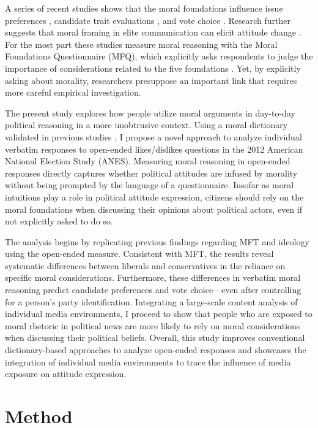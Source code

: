 \documentclass[12pt]{article}
\begin{document}
A series of recent studies shows that the moral foundations influence issue preferences \citep{kertzer2014moral}, candidate trait evaluations \citep{clifford2014linking}, and vote choice \citep{iyer2010beyond}. Research further suggests that moral framing in elite communication can elicit attitude change \citep[e.g.][]{clifford2015concerns,feinberg2013moral}. For the most part these studies measure moral reasoning with the Moral Foundations Questionnaire (MFQ), which explicitly asks respondents to judge the importance of considerations related to the five foundations \citep[e.g.,][]{graham2011mapping}. Yet, by explicitly asking about morality, researchers presuppose an important link that requires more careful empirical investigation.

The present study explores how people utilize moral arguments in day-to-day political reasoning in a more unobtrusive context. Using a moral dictionary validated in previous studies \citep{graham2009liberals}, I propose a novel approach to analyze individual verbatim responses to open-ended likes/dislikes questions in the 2012 American National Election Study (ANES). Measuring moral reasoning in open-ended responses directly captures whether political attitudes are infused by morality without being prompted by the language of a questionnaire. Insofar as moral intuitions play a role in political attitude expression, citizens should rely on the moral foundations when discussing their opinions about political actors, even if not explicitly asked to do so.

The analysis begins by replicating previous findings regarding MFT and ideology using the open-ended measure. Consistent with MFT, the results reveal systematic differences between liberals and conservatives in the reliance on specific moral considerations. Furthermore, these differences in verbatim moral reasoning predict candidate preferences and vote choice---even after controlling for a person's party identification. Integrating a large-scale content analysis of individual media environments, I proceed to show that people who are exposed to moral rhetoric in political news are more likely to rely on moral considerations when discussing their political beliefs. Overall, this study improves conventional dictionary-based approaches to analyze open-ended responses and showcases the integration of individual media environments to trace the influence of media exposure on attitude expression.


\section*{Method}
\end{document}
